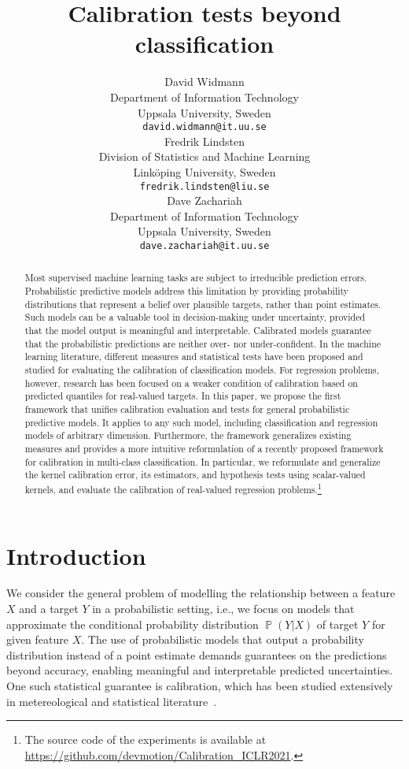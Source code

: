 \documentclass{article}
\title{Calibration tests beyond classification}
\author{%
  David Widmann\\
  Department of Information Technology\\
  Uppsala University, Sweden\\
  \texttt{david.widmann@it.uu.se} \\
  \And
  Fredrik Lindsten\\
  Division of Statistics and Machine Learning\\
  Linköping University, Sweden\\
  \texttt{fredrik.lindsten@liu.se} \\
  \And
  Dave Zachariah\\
  Department of Information Technology\\
  Uppsala University, Sweden\\
  \texttt{dave.zachariah@it.uu.se}\\
}
\DeclareMathOperator{\Prob}{\mathbb{P}}
\begin{document}
\maketitle

\begin{abstract}
Most supervised machine learning tasks are subject to irreducible prediction
errors. Probabilistic predictive models address this limitation by providing
probability distributions that represent a belief over plausible targets,
rather than point estimates. Such models can be a valuable tool in
decision-making under uncertainty, provided that the model output is
meaningful and interpretable. Calibrated models guarantee that the probabilistic
predictions are neither over- nor under-confident. In the machine learning literature,
different measures and statistical tests have been proposed and studied
for evaluating the calibration of classification models. For
regression problems, however, research has been focused on a weaker
condition of calibration based on predicted quantiles for real-valued targets.
In this paper, we propose the first framework that unifies calibration evaluation and
tests for general probabilistic predictive models. It applies to any such model, including
classification and regression models of arbitrary dimension. Furthermore,
the framework generalizes existing measures and provides a more intuitive
reformulation of a recently proposed framework for calibration in
multi-class classification. In particular, we reformulate and generalize the
kernel calibration error, its estimators, and hypothesis tests using scalar-valued
kernels, and evaluate the calibration of real-valued regression
problems.\footnote{The source code of the experiments is available at
\url{https://github.com/devmotion/Calibration_ICLR2021}.}
\end{abstract}

\section{Introduction}

We consider the general problem of modelling the relationship
between a feature $X$ and a target $Y$ in a probabilistic setting, i.e., we
focus on models that approximate the conditional probability
distribution $\Prob(Y | X)$ of target $Y$ for given feature $X$. The use of
probabilistic models that output a probability distribution instead
of a point estimate demands guarantees on the predictions beyond accuracy,
enabling meaningful and interpretable predicted uncertainties. One such statistical
guarantee is calibration, which has been studied extensively in metereological
and statistical literature~\citep{DeGroot1983,Murphy1977}.
\end{document}
